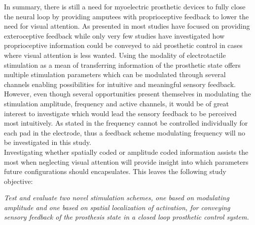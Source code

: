 

In summary, there is still a need for myoelectric prosthetic devices to fully close the neural loop by providing amputees with proprioceptive feedback to lower the need for visual attention. As presented in  most studies have focused on providing exteroceptive feedback while only very few studies have investigated how proprioceptive information could be conveyed to aid prosthetic control in cases where visual attention is less wanted. Using the modality of electrotactile stimulation as a mean of transferring information of the prosthetic state offers multiple stimulation parameters which can be modulated through several channels enabling possibilities for intuitive and meaningful sensory feedback. However, even though several opportunities present themselves in modulating the stimulation amplitude, frequency and active channels, it would be of great interest to investigate which would lead the sensory feedback to be perceived most intuitively. As stated in  the frequency cannot be controlled individually for each pad in the electrode, thus a feedback scheme modulating frequency will no be investigated in this study. \\ Investigating whether spatially coded or amplitude coded information assists the most when neglecting visual attention will provide insight into which parameters future configurations should encapsulates. This leaves the following study objective: 

\begin{center}
	\textit{Test and evaluate two novel stimulation schemes, one based on modulating amplitude and one based on spatial localization of activation, for conveying sensory feedback of the prosthesis state in a closed loop prosthetic control system.}  
\end{center} 